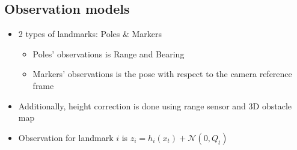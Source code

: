 \documentclass[serif]{beamer}
\begin{document}
    \subsection{Observation models}
    \begin{frame}
        \begin{itemize}
            \item{2 types of landmarks: Poles \& Markers
                \begin{itemize}
                    \item{Poles' observations is Range and Bearing}
                    \item{Markers' observations is the pose with respect to the camera reference frame}
                \end{itemize}
            }
            \item{Additionally, height correction is done using range sensor and 3D obstacle map}
            \item{Observation for landmark $i$ is $z_i = h_i\left(x_t\right) + \mathcal{N}\left(0, Q_t\right)$}

        \end{itemize}
    \end{frame}
\end{document}
